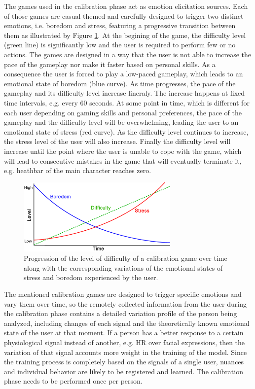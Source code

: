 The games used in the calibration phase act as emotion elicitation sources. Each of those games are casual-themed and carefully designed to trigger two distinct emotions, i.e. boredom and stress, featuring a progressive transition between them as illustrated by Figure \ref{fig:calibration-game-linear}. At the begining of the game, the difficulty level (green line) is significantly low and the user is required to perform few or no actions. The games are designed in a way that the user is not able to increase the pace of the gameplay nor make it faster based on personal skills. As a consequence the user is forced to play a low-paced gameplay, which leads to an emotional state of boredom (blue curve). As time progresses, the pace of the gameplay and its difficulty level increase lineraly. The increase happens at fixed time intervals, e.g. every 60 seconds. At some point in time, which is different for each user depending on gaming skills and personal preferences, the pace of the gameplay and the difficulty level will be overwhelming, leading the user to an emotional state of stress (red curve). As the difficulty level continues to increase, the stress level of the user will also increase. Finally the difficulty level will increase until the point where the user is unable to cope with the game, which will lead to consecutive mistakes in the game that will eventually terminate it, e.g. heathbar of the main character reaches zero.

\begin{figure}[h!]
    \centering
    \includegraphics[width=0.7\textwidth]{figures/calibration-game-linear.png}
    \caption{Progression of the level of difficulty of a calibration game over time along with the corresponding variations of the emotional states of stress and boredom experienced by the user.}
    \label{fig:calibration-game-linear}
\end{figure}

The mentioned calibration games are designed to trigger specific emotions and vary them over time, so the remotely collected information from the user during the calibration phase contains a detailed variation profile of the person being analyzed, including changes of each signal and the theoretically known emotional state of the user at that moment. If a person has a better response to a certain physiological signal instead of another, e.g. HR over facial expressions, then the variation of that signal accounts more weight in the training of the model. Since the training process is completely based on the signals of a single user, nuances and individual behavior are likely to be registered and learned. The calibration phase needs to be performed once per person.

